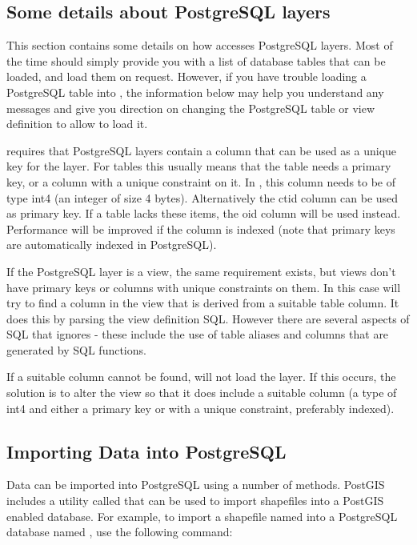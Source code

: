\subsection{Some details about PostgreSQL
layers}\label{sec:postgis_details}

This section contains some details on how \qg accesses PostgreSQL
layers. Most of the time \qg should simply provide you with a list of
database tables that can be loaded, and load them on request. However,
if you have trouble loading a PostgreSQL table into \qg, the information
below may help you understand any \qg messages and give you direction on
changing the PostgreSQL table or view definition to allow \qg to load it.

\qg requires that PostgreSQL layers contain a column that can be
used as a unique key for the layer. For tables this usually means
that the table needs a primary key, or a column with a unique
constraint on it. In \qg, this column needs to be of
type int4 (an integer of size 4 bytes). Alternatively the ctid column can be
used as primary key. If a table lacks these items,
the oid column will be used instead. Performance will be improved if the
column is indexed (note that primary keys are automatically indexed in
PostgreSQL). 

If the PostgreSQL layer is a view, the same requirement exists, but
views don't have primary keys or columns with unique constraints on
them. In this case \qg will try to find a column in the view that is
derived from a suitable table column. It does this by parsing the view
definition SQL. However there are several aspects of SQL that \qg ignores
- these include the use of table aliases and columns that are generated by
SQL functions.

If a suitable column cannot be found, \qg will not load the layer. If this
occurs, the solution is to alter the view so that it does include a suitable
column (a type of int4 and either a primary key or with a unique constraint,
preferably indexed).


\subsection{Importing Data into PostgreSQL}\label{sec:loading_postgis_data}

Data can be imported into PostgreSQL using a number of methods. PostGIS
includes a utility called  that can be used to import shapefiles into
a PostGIS enabled database. For example, to import a shapefile named
into a PostgreSQL database named , use the following command:

